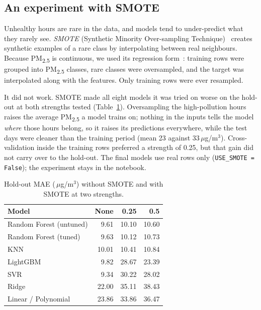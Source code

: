 \documentclass{ieeeaccess}
\newcommand{\ugm}{\,$\mu$g/m$^{3}$}
\newcommand{\pmtwo}{PM\textsubscript{2.5}}
\begin{document}
\subsection{An experiment with SMOTE}
\label{sec:smote}
Unhealthy hours are rare in the data, and models tend to under-predict what they rarely see. \emph{SMOTE} (Synthetic Minority Over-sampling Technique)~\cite{chawla2002} creates synthetic examples of a rare class by interpolating between real neighbours. Because \pmtwo{} is continuous, we used its regression form~\cite{torgo2013}: training rows were grouped into \pmtwo{} classes, rare classes were oversampled, and the target was interpolated along with the features. Only training rows were ever resampled.

It did not work. SMOTE made all eight models it was tried on worse on the hold-out at both strengths tested (Table~\ref{tab:smote}). Oversampling the high-pollution hours raises the average \pmtwo{} a model trains on; nothing in the inputs tells the model \emph{where} those hours belong, so it raises its predictions everywhere, while the test days were cleaner than the training period (mean 23 against 33\ugm). Cross-validation inside the training rows preferred a strength of 0.25, but that gain did not carry over to the hold-out. The final models use real rows only (\texttt{USE\_SMOTE = False}); the experiment stays in the notebook.

\begin{table}[t]
\caption{Hold-out MAE (\ugm) without SMOTE and with SMOTE at two strengths.}
\label{tab:smote}
\centering
\begin{tabular}{lrrr}
\toprule
Model & None & 0.25 & 0.5 \\
\midrule
Random Forest (untuned) & 9.61 & 10.10 & 10.60 \\
Random Forest (tuned) & 9.63 & 10.12 & 10.73 \\
KNN & 10.01 & 10.41 & 10.84 \\
LightGBM & 9.82 & 28.67 & 23.39 \\
SVR & 9.34 & 30.22 & 28.02 \\
Ridge & 22.00 & 35.11 & 38.43 \\
Linear / Polynomial & 23.86 & 33.86 & 36.47 \\
\bottomrule
\end{tabular}
\end{table}
\end{document}
